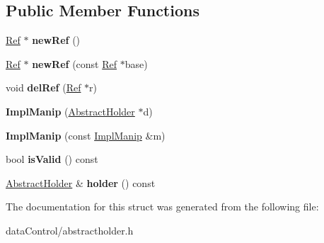 \subsection*{Public Member Functions}
\begin{DoxyCompactItemize}
\item 
\hypertarget{struct_tempest_1_1_abstract_holder_1_1_impl_manip_acb6966061542378fc0af8fa3093a3db3}{\hyperlink{struct_tempest_1_1_abstract_holder_1_1_impl_manip_1_1_ref}{Ref} $\ast$ {\bfseries new\+Ref} ()}\label{struct_tempest_1_1_abstract_holder_1_1_impl_manip_acb6966061542378fc0af8fa3093a3db3}

\item 
\hypertarget{struct_tempest_1_1_abstract_holder_1_1_impl_manip_a7750c8209e9b2d0385f378bb367e224a}{\hyperlink{struct_tempest_1_1_abstract_holder_1_1_impl_manip_1_1_ref}{Ref} $\ast$ {\bfseries new\+Ref} (const \hyperlink{struct_tempest_1_1_abstract_holder_1_1_impl_manip_1_1_ref}{Ref} $\ast$base)}\label{struct_tempest_1_1_abstract_holder_1_1_impl_manip_a7750c8209e9b2d0385f378bb367e224a}

\item 
\hypertarget{struct_tempest_1_1_abstract_holder_1_1_impl_manip_a5bd0a0d96953a45a04eff4a74b89bb5f}{void {\bfseries del\+Ref} (\hyperlink{struct_tempest_1_1_abstract_holder_1_1_impl_manip_1_1_ref}{Ref} $\ast$r)}\label{struct_tempest_1_1_abstract_holder_1_1_impl_manip_a5bd0a0d96953a45a04eff4a74b89bb5f}

\item 
\hypertarget{struct_tempest_1_1_abstract_holder_1_1_impl_manip_a4f5a144dd73820e876927ee5345bd6cd}{{\bfseries Impl\+Manip} (\hyperlink{class_tempest_1_1_abstract_holder}{Abstract\+Holder} $\ast$d)}\label{struct_tempest_1_1_abstract_holder_1_1_impl_manip_a4f5a144dd73820e876927ee5345bd6cd}

\item 
\hypertarget{struct_tempest_1_1_abstract_holder_1_1_impl_manip_a32917f5e07d72b97047552fbd0589d58}{{\bfseries Impl\+Manip} (const \hyperlink{struct_tempest_1_1_abstract_holder_1_1_impl_manip}{Impl\+Manip} \&m)}\label{struct_tempest_1_1_abstract_holder_1_1_impl_manip_a32917f5e07d72b97047552fbd0589d58}

\item 
\hypertarget{struct_tempest_1_1_abstract_holder_1_1_impl_manip_a6f65ce6d60258e15f1cb43d4676fc541}{bool {\bfseries is\+Valid} () const }\label{struct_tempest_1_1_abstract_holder_1_1_impl_manip_a6f65ce6d60258e15f1cb43d4676fc541}

\item 
\hypertarget{struct_tempest_1_1_abstract_holder_1_1_impl_manip_a781b785bbf92fad5cd722d2b299c2d04}{\hyperlink{class_tempest_1_1_abstract_holder}{Abstract\+Holder} \& {\bfseries holder} () const }\label{struct_tempest_1_1_abstract_holder_1_1_impl_manip_a781b785bbf92fad5cd722d2b299c2d04}

\end{DoxyCompactItemize}


The documentation for this struct was generated from the following file\+:\begin{DoxyCompactItemize}
\item 
data\+Control/abstractholder.\+h\end{DoxyCompactItemize}
